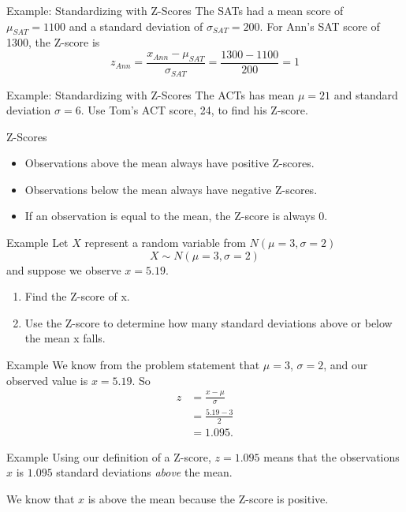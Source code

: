\begin{frame}{Example: Standardizing with Z-Scores}
    The SATs had a mean score of $\mu_{SAT}=1100$ and a standard deviation of $\sigma_{SAT}=200$. For Ann's SAT score of 1300, the Z-score is
    \[
        z_{Ann}=\frac{x_{Ann}-\mu_{SAT}}{\sigma_{SAT}} = \frac{1300-1100}{200} = 1
    \]
\end{frame}

\begin{frame}{Example: Standardizing with Z-Scores}
    The ACTs has mean $\mu=21$ and standard deviation $\sigma=6$. Use Tom’s ACT score, 24, to find his Z-score.
\end{frame}

\begin{frame}{Z-Scores}
    \begin{itemize}
        \item Observations above the mean always have positive Z-scores.
        \item Observations below the mean always have negative Z-scores. 
        \item If an observation is equal to the mean, the Z-score is always 0.
    \end{itemize}
\end{frame}

\begin{frame}{Example}
    Let $X$ represent a random variable from $N (\mu = 3, \sigma = 2)$
    \[
        X \sim N (\mu = 3, \sigma = 2)
    \]
    and suppose we observe $x = 5.19$.
    \begin{enumerate}
        \item Find the Z-score of x.
        \item Use the Z-score to determine how many standard deviations above or below the mean x falls.
    \end{enumerate}
\end{frame}

\begin{frame}{Example}
    We know from the problem statement that $\mu = 3$, $\sigma = 2$, and our observed value is $x=5.19$. So
    \begin{align*}
        z &= \frac{x-\mu}{\sigma} \\
            &= \frac{5.19-3}{2} \\
            &= 1.095.
    \end{align*}
\end{frame}

\begin{frame}{Example}
    Using our definition of a Z-score, $z = 1.095$ means that the observations $x$ is $1.095$ standard deviations \textit{above} the mean.
    
    \vspace{12pt}We know that $x$ is above the mean because the Z-score is positive.
\end{frame}


